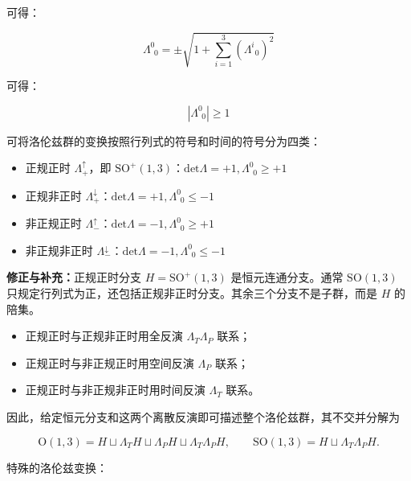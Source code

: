 可得：

\begin{equation}
\Lambda^0_{~~0} 
=\pm \sqrt{1+\sum_{i=1}^{3} \left(\Lambda^i_{~~0} \right)^2}
\end{equation}

可得：

\begin{equation}
\left|\Lambda^0_{~~0} \right|\geqslant 1
\end{equation}

可将洛伦兹群的变换按照行列式的符号和时间的符号分为四类：

\begin{itemize}
\item 正规正时 $\Lambda_+^\uparrow$，即 $\mathrm{SO}^{+}\left(1,3\right)$：$\mathrm{det}\Lambda=+1,\Lambda^0_{~~0}\geqslant +1$

\item 正规非正时 $\Lambda_+^\downarrow$：$\mathrm{det}\Lambda=+1,\Lambda^0_{~~0}\leqslant -1$

\item 非正规正时 $\Lambda_-^\uparrow$：$\mathrm{det}\Lambda=-1,\Lambda^0_{~~0}\geqslant +1$

\item 非正规非正时 $\Lambda_-^\downarrow$：$\mathrm{det}\Lambda=-1,\Lambda^0_{~~0}\leqslant -1$

\end{itemize}
\textbf{修正与补充：}正规正时分支 $H=\mathrm{SO}^{+}\left(1,3\right)$ 是恒元连通分支。通常 $\mathrm{SO}\left(1,3\right)$ 只规定行列式为正，还包括正规非正时分支。其余三个分支不是子群，而是 $H$ 的陪集。

\begin{itemize}
\item 正规正时与正规非正时用全反演 $\Lambda_T\Lambda_P$ 联系；
\item 正规正时与非正规正时用空间反演 $\Lambda_P$ 联系；
\item 正规正时与非正规非正时用时间反演 $\Lambda_T$ 联系。

\end{itemize}
因此，给定恒元分支和这两个离散反演即可描述整个洛伦兹群，其不交并分解为

\begin{equation}
\mathrm{O}\left(1,3\right)=H\sqcup\Lambda_TH\sqcup\Lambda_PH\sqcup\Lambda_T\Lambda_PH,
\qquad \mathrm{SO}\left(1,3\right)=H\sqcup\Lambda_T\Lambda_PH.
\end{equation}

特殊的洛伦兹变换：

